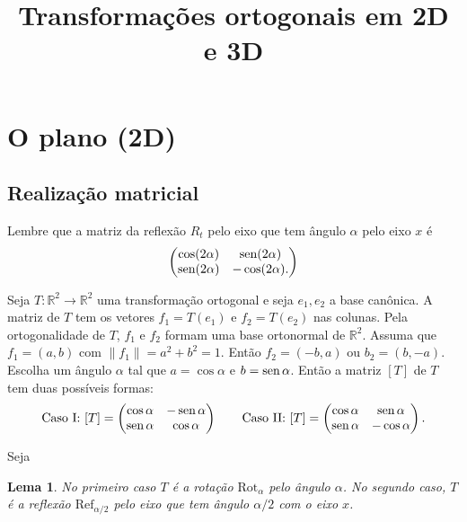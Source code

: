 \documentclass[12pt]{amsart}
\newcommand{\R}{\mathbb R}
\DeclareMathOperator{\sen}{\textrm{\rm sen}}
\newcommand{\rot}[1]{{\textrm{Rot}}_{#1}}
\newcommand{\refl}[1]{{\textrm{Ref}}_{#1}}
\newtheorem{lemma}[theorem]{Lema}
\theoremstyle{definition}
\begin{document}
\title[Isometrias do espaço]{Transformações ortogonais em 2D e 3D}
\maketitle


\section{O plano (2D)}

\subsection{Realização matricial}
Lembre que a matriz da reflexão $R_t$ pelo eixo que tem ângulo $\alpha$ pelo eixo $x$ é
\[ 
\begin{pmatrix}\cos(2\alpha) & \sen(2\alpha) \\ \sen(2\alpha) & -\cos(2\alpha).
\end{pmatrix}
\]

Seja $T:\R^2\to\R^2$ uma transformação ortogonal e seja $e_1,e_2$ a base canônica. 
A matriz de $T$ tem os vetores $f_1=T(e_1)$ e $f_2=T(e_2)$ nas colunas. Pela ortogonalidade de 
$T$, $f_1$ e $f_2$ formam uma base ortonormal de $\R^2$. Assuma que $f_1=(a,b)$ com $\|f_1\|=a^2+b^2=1$. Então 
$f_2=(-b,a)$ ou $b_2=(b,-a)$.  Escolha um ângulo $\alpha$ tal  que $a=\cos\alpha$ e $b=\sen\alpha$. 
Então a matriz $[T]$ de $T$ tem duas possíveis formas:
\[ 
    \mbox{Caso I:}\ [T]=\begin{pmatrix}\cos \alpha & -\sen \alpha\\\sen\alpha &\cos\alpha\end{pmatrix}\\
    \qquad
    \mbox{Caso II:}\ [T]=\begin{pmatrix}\cos \alpha & \sen \alpha\\\sen\alpha &-\cos\alpha\end{pmatrix}.
\]

Seja 

\begin{lemma}
    No primeiro caso $T$ é a rotação $\rot\alpha$ pelo ângulo $\alpha$. No segundo caso, $T$ é a 
    reflexão $\refl{\alpha/2}$ pelo eixo que 
    tem ângulo $\alpha/2$ com o eixo $x$. 
\end{lemma}
\end{document}
